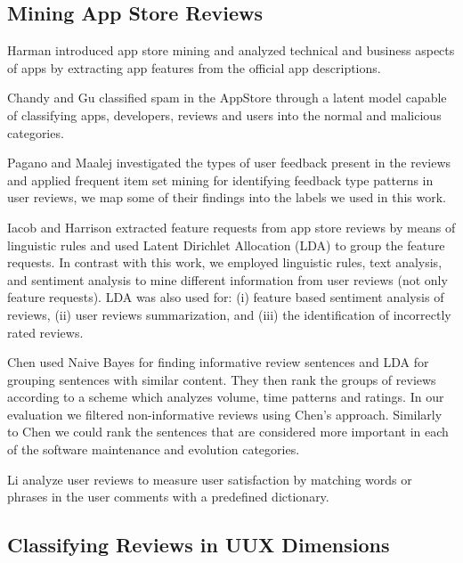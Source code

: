 \subsection{Mining App Store Reviews}

Harman \etal \cite{paper:Harman} introduced app store mining and analyzed technical and business aspects of apps by extracting app features from the official app descriptions. 

Chandy and Gu \cite{paper:Chandy} classified spam in the AppStore through a latent model capable of classifying apps, developers, reviews and users into the normal and malicious categories. 

Pagano and Maalej \cite{paper:Pagano} investigated the types of user feedback present in the reviews and applied frequent item set mining for identifying feedback type patterns in user reviews, we map some of their findings into the labels we used in this work. 

Iacob and Harrison \cite{paper:Iacob} extracted feature requests from app store reviews by means of linguistic rules and used Latent Dirichlet Allocation (LDA) \cite{paper:Blei2003} to group the feature requests. In contrast with this work, we employed linguistic rules, text analysis, and sentiment analysis to mine different information from user reviews (not only feature requests).  
LDA was also used for: (i) feature based sentiment analysis of reviews\cite{paper:Guzman}, (ii) user reviews summarization\cite{paper:Galvis}, and (iii) the identification of incorrectly rated reviews\cite{paper:Fu}. 

Chen \etal \cite{paper:ARminer} used Naive Bayes for finding informative review sentences and LDA for grouping sentences with similar content. They then rank the groups of reviews according to a scheme which analyzes volume, time patterns and ratings. In our evaluation we filtered non-informative reviews using Chen's \etal approach. Similarly to Chen \etal \cite{paper:ARminer} we could rank the sentences that are considered more important in each of the software maintenance and evolution categories. 

Li \etal \cite{paper:Li} analyze user reviews to measure user satisfaction by matching words or phrases in the user comments with a predefined dictionary. 

\subsection{Classifying Reviews in UUX Dimensions} 

